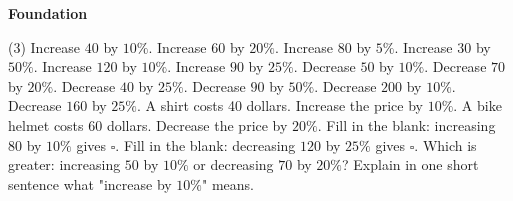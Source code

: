 \documentclass[17pt,a4paper,landscape]{extarticle}
\begin{document}
\sffamily
\boldmath

\boldmath

\boldmath

{\LARGE \textbf{Foundation}}
\begin{tasks}(3)
\task Increase \mbox{$40$} by \mbox{$10\%$}.
\task Increase \mbox{$60$} by \mbox{$20\%$}.
\task Increase \mbox{$80$} by \mbox{$5\%$}.
\task Increase \mbox{$30$} by \mbox{$50\%$}.
\task Increase \mbox{$120$} by \mbox{$10\%$}.
\task Increase \mbox{$90$} by \mbox{$25\%$}.
\task Decrease \mbox{$50$} by \mbox{$10\%$}.
\task Decrease \mbox{$70$} by \mbox{$20\%$}.
\task Decrease \mbox{$40$} by \mbox{$25\%$}.
\task Decrease \mbox{$90$} by \mbox{$50\%$}.
\task Decrease \mbox{$200$} by \mbox{$10\%$}.
\task Decrease \mbox{$160$} by \mbox{$25\%$}.
\task A shirt costs 40 dollars. Increase the price by \mbox{$10\%$}.
\task A bike helmet costs 60 dollars. Decrease the price by \mbox{$20\%$}.
\task Fill in the blank: increasing \mbox{$80$} by \mbox{$10\%$} gives \mbox{$\square$}.
\task Fill in the blank: decreasing \mbox{$120$} by \mbox{$25\%$} gives \mbox{$\square$}.
\task Which is greater: increasing \mbox{$50$} by \mbox{$10\%$} or decreasing \mbox{$70$} by \mbox{$20\%$}?
\task Explain in one short sentence what "increase by \mbox{$10\%$}" means.
\end{tasks}
\end{document}
